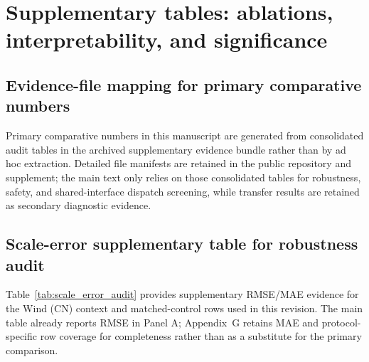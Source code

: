﻿\documentclass[review,1p,times]{elsarticle}
\begin{document}
\section{Supplementary tables: ablations, interpretability, and significance}\label{app:supp_tables}

\subsection{Evidence-file mapping for primary comparative numbers}
\label{subsec:evidence_mapping}
Primary comparative numbers in this manuscript are generated from consolidated audit tables in the archived supplementary evidence bundle rather than by ad hoc extraction. Detailed file manifests are retained in the public repository and supplement; the main text only relies on those consolidated tables for robustness, safety, and shared-interface dispatch screening, while transfer results are retained as secondary diagnostic evidence.

\subsection{Scale-error supplementary table for robustness audit}
\label{subsec:scale_error_audit}
Table~\ref{tab:scale_error_audit} provides supplementary RMSE/MAE evidence for the Wind (CN) context and matched-control rows used in this revision. The main table already reports RMSE in Panel A; Appendix~G retains MAE and protocol-specific row coverage for completeness rather than as a substitute for the primary comparison.
\end{document}
